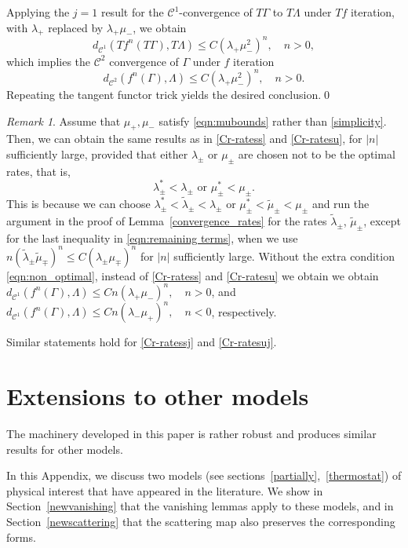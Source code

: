 \documentclass[11pt]{amsart}
\theoremstyle{definition}
\theoremstyle{remark}
\newtheorem{rem}[thm]{Remark}
\numberwithin{equation}{section}
\newcommand{\C}{\mathcal{C}}
\begin{document}
  Applying the $j = 1$ result for the $\C^1$-convergence of $T\Gamma$  to
   $T\Lambda$ under $Tf$ iteration, with $\lambda_+$ replaced by $\lambda_+\mu_-$,
   we obtain
 \[d_{\C^1} (Tf^n(T\Gamma), T\Lambda) \le
      C  (\lambda_+  \mu_-^2)^n, \quad n > 0 ,\]
      which implies the $\C^2$ convergence of $\Gamma$ under $f$ iteration
\[d_{\C^2} ( f^n( \Gamma),  \Lambda) \le
      C  (\lambda_+  \mu_-^2)^n, \quad n > 0 .\]
Repeating the tangent functor trick yields the desired conclusion.\qed

\begin{rem} Assume that $\mu_+,\mu_-$ satisfy \eqref{eqn:mubounds} rather than \eqref{simplicity}. Then, we can obtain the same results as in \eqref{Cr-ratess} and \eqref{Cr-ratesu}, for $|n|$ sufficiently large, provided that either $\lambda_\pm$ or $\mu_\pm$ are chosen not to be the optimal rates, that is, \begin{equation}\label{eqn:non_optimal} \lambda^*_\pm<\lambda_\pm \textrm { or }\mu_\pm^*<\mu_\pm.\end{equation}
This is because we can choose $\lambda^*_\pm<\tilde\lambda_\pm<\lambda_\pm$ or $\mu_\pm^*<\tilde\mu_\pm<\mu_\pm$ and run the argument in the proof of Lemma~\ref{convergence_rates} for the rates $\tilde\lambda_\pm$, $\tilde\mu_\pm$, except for the last inequality in  \eqref{eqn:remaining terms}, when we use $n(\tilde\lambda_\pm\tilde\mu_\mp)^n \le C(\lambda_\pm \mu_\mp)^n$ for $|n|$ sufficiently large.
Without the extra condition \eqref{eqn:non_optimal},
instead of \eqref{Cr-ratess} and \eqref{Cr-ratesu} we obtain
we obtain $d_{\C^1} (f^n(\Gamma), \Lambda) \le
      C  n(\lambda_+  \mu_-)^n, \quad n > 0$, and $d_{\C^1} (f^n(\Gamma), \Lambda) \le
      C  n(\lambda_-  \mu_+)^n, \quad n < 0$, respectively.

Similar statements hold for \eqref{Cr-ratessj} and \eqref{Cr-ratesuj}.
\end{rem}


\section{Extensions to other models}
\label{othermodels}

The machinery developed in this paper is rather robust and
produces similar results for other models.

In this Appendix, we discuss two models
(see sections~\ref{partially},~\ref{thermostat})
of physical interest that have appeared in the literature.
We show in Section~\ref{newvanishing} that the
vanishing lemmas apply to these models, and in Section~\ref{newscattering}
that the scattering map also preserves the  corresponding forms.
\end{document}

